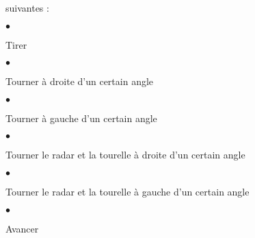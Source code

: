 \documentclass[a4paper,portrait,12pt]{article}
\begin{document}
\begin{flushleft}
suivantes :
\end{flushleft}


$\bullet$





\begin{flushleft}
Tirer
\end{flushleft}





$\bullet$





\begin{flushleft}
Tourner \`{a} droite d'un certain angle
\end{flushleft}





$\bullet$





\begin{flushleft}
Tourner \`{a} gauche d'un certain angle
\end{flushleft}





$\bullet$





\begin{flushleft}
Tourner le radar et la tourelle \`{a} droite d'un certain angle
\end{flushleft}





$\bullet$





\begin{flushleft}
Tourner le radar et la tourelle \`{a} gauche d'un certain angle
\end{flushleft}





$\bullet$





\begin{flushleft}
Avancer
\end{flushleft}
\end{document}
